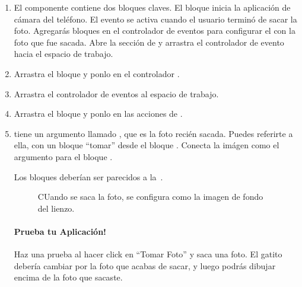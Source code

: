 \begin{enumerate}

\item El componente  contiene dos bloques claves. El
  bloque  inicia la aplicación de cámara del
  teléfono. El evento  se activa
  cuando el usuario terminó de sacar la foto. Agregarás bloques en el
  controlador de eventos  para
  configurar el  con la foto que
  fue sacada. Abre la sección de  y arrastra el
  controlador de evento  hacia el espacio
  de trabajo.

\item Arrastra el bloque  y ponlo en el
  controlador .

\item Arrastra el controlador de eventos
   al espacio de trabajo.

\item Arrastra el bloque  y
  ponlo en las acciones de .

\item {} tiene un argumento
  llamado , que es la foto recién sacada. Puedes
  referirte a ella, con un bloque ``tomar'' desde el bloque
  . Conecta la imágen como el
  argumento para el bloque .
	
  Los bloques deberían ser parecidos a la~.

\begin{figure}[H]
\centering
\caption{CUando se saca la foto, se configura como la imagen de fondo
  del lienzo.}
\label{fig:PaintPot14}
\end{figure}

\paragraph{Prueba tu Aplicación!} Haz una prueba al hacer click en
``Tomar Foto'' y saca una foto. El gatito debería cambiar por la foto
que acabas de sacar, y luego podrás dibujar encima de la foto que
sacaste.

\end{enumerate}

